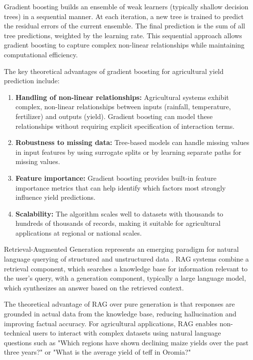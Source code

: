 Gradient boosting builds an ensemble of weak learners (typically shallow decision trees) in a sequential manner. At each iteration, a new tree is trained to predict the residual errors of the current ensemble. The final prediction is the sum of all tree predictions, weighted by the learning rate. This sequential approach allows gradient boosting to capture complex non-linear relationships while maintaining computational efficiency.

The key theoretical advantages of gradient boosting for agricultural yield prediction include:
\begin{enumerate}
  \item \textbf{Handling of non-linear relationships:} Agricultural systems exhibit complex, non-linear relationships between inputs (rainfall, temperature, fertilizer) and outputs (yield). Gradient boosting can model these relationships without requiring explicit specification of interaction terms.
  \item \textbf{Robustness to missing data:} Tree-based models can handle missing values in input features by using surrogate splits or by learning separate paths for missing values.
  \item \textbf{Feature importance:} Gradient boosting provides built-in feature importance metrics that can help identify which factors most strongly influence yield predictions.
  \item \textbf{Scalability:} The algorithm scales well to datasets with thousands to hundreds of thousands of records, making it suitable for agricultural applications at regional or national scales.
\end{enumerate}

Retrieval-Augmented Generation represents an emerging paradigm for natural language querying of structured and unstructured data \cite{lewis2020}. RAG systems combine a retrieval component, which searches a knowledge base for information relevant to the user's query, with a generation component, typically a large language model, which synthesizes an answer based on the retrieved context.

The theoretical advantage of RAG over pure generation is that responses are grounded in actual data from the knowledge base, reducing hallucination and improving factual accuracy. For agricultural applications, RAG enables non-technical users to interact with complex datasets using natural language questions such as "Which regions have shown declining maize yields over the past three years?" or "What is the average yield of teff in Oromia?"

